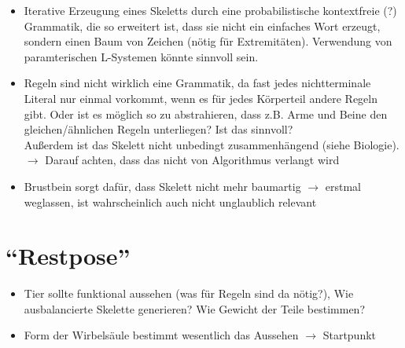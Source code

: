  \begin{itemize}
  \item Iterative Erzeugung eines Skeletts durch eine probabilistische kontextfreie (?) Grammatik, die so erweitert ist, dass sie nicht ein einfaches Wort erzeugt, sondern einen Baum von Zeichen (nötig für Extremitäten). Verwendung von paramterischen L-Systemen \cite{Paramteric_L-Systems} könnte sinnvoll sein.
  
  \item Regeln sind nicht wirklich eine Grammatik, da fast jedes nichtterminale Literal nur einmal vorkommt, wenn es für jedes Körperteil andere Regeln gibt. Oder ist es möglich so zu abstrahieren, dass z.B. Arme und Beine den gleichen/ähnlichen Regeln unterliegen? Ist das sinnvoll? \\
  Außerdem ist das Skelett nicht unbedingt zusammenhängend (siehe Biologie). $\rightarrow$ Darauf achten, dass das nicht von Algorithmus verlangt wird
  
  \item Brustbein sorgt dafür, dass Skelett nicht mehr baumartig $\rightarrow$ erstmal weglassen, ist wahrscheinlich auch nicht unglaublich relevant
 \end{itemize}

 

\section{"`Restpose"'}

\begin{itemize}
  \item Tier sollte funktional aussehen (was für Regeln sind da nötig?), Wie ausbalancierte Skelette generieren? Wie Gewicht der Teile bestimmen?
  \item Form der Wirbelsäule bestimmt wesentlich das Aussehen $\rightarrow$ Startpunkt
 \end{itemize}
 
